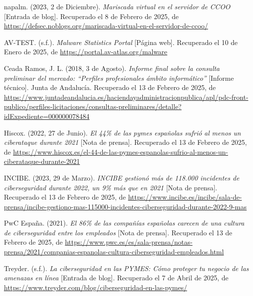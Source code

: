 \documentclass[a4paper, 11pt]{article}
\begin{document}
\begin{thebibliography}{99}
    
    napalm. (2023, 2 de Diciembre). \textit{Mariscada virtual en el servidor de CCOO} [Entrada de blog]. Recuperado el 8 de Febrero de 2025, de \url{https://defsec.noblogs.org/mariscada-virtual-en-el-servidor-de-ccoo/}

    AV-TEST. (s.f.). \textit{Malware Statistics Portal} [Página web]. Recuperado el 10 de Enero de 2025, de \url{https://portal.av-atlas.org/malware}

    Ceada Ramos, J. L. (2018, 3 de Agosto). \textit{Informe final sobre la consulta preliminar del mercado: “Perfiles profesionales ámbito informático”} [Informe técnico]. Junta de Andalucía. Recuperado el 13 de Febrero de 2025, de \url{https://www.juntadeandalucia.es/haciendayadministracionpublica/apl/pdc-front-publico/perfiles-licitaciones/consultas-preliminares/detalle?idExpediente=000000078484}

    Hiscox. (2022, 27 de Junio). \textit{El 44\% de las pymes españolas sufrió al menos un ciberataque durante 2021} [Nota de prensa]. Recuperado el 13 de Febrero de 2025, de \url{https://www.hiscox.es/el-44-de-las-pymes-espanolas-sufrio-al-menos-un-ciberataque-durante-2021}

    INCIBE. (2023, 29 de Marzo). \textit{INCIBE gestionó más de 118.000 incidentes de ciberseguridad durante 2022, un 9\% más que en 2021} [Nota de prensa]. Recuperado el 13 de Febrero de 2025, de \url{https://www.incibe.es/incibe/sala-de-prensa/incibe-gestiono-mas-115000-incidentes-ciberseguridad-durante-2022-9-mas}

    PwC España. (2021). \textit{El 86\% de las compañías españolas carecen de una cultura de ciberseguridad entre los empleados} [Nota de prensa]. Recuperado el 13 de Febrero de 2025, de \url{https://www.pwc.es/es/sala-prensa/notas-prensa/2021/companias-espanolas-cultura-ciberseguridad-empleados.html}

    Treyder. (s.f.). \textit{La ciberseguridad en las PYMES: Cómo proteger tu negocio de las amenazas en línea} [Entrada de blog]. Recuperado el 7 de Abril de 2025, de \url{https://www.treyder.com/blog/ciberseguridad-en-las-pymes/}


\end{thebibliography}
\end{document}
